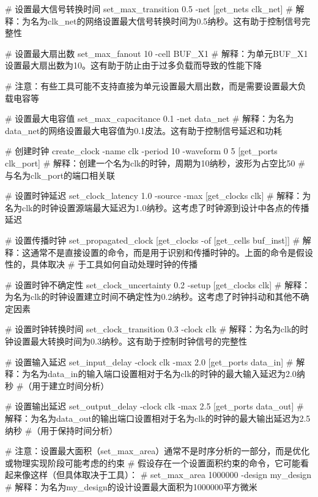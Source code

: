 \begin{CodeBlock}[language=BookTcl]
# 设置最大信号转换时间  
set_max_transition 0.5 -net [get_nets clk_net]  
# 解释：为名为clk_net的网络设置最大信号转换时间为0.5纳秒。这有助于控制信号完整性
  
# 设置最大扇出数  
set_max_fanout 10 -cell BUF_X1  
# 解释：为单元BUF_X1设置最大扇出数为10。这有助于防止由于过多负载而导致的性能下降
  
# 注意：有些工具可能不支持直接为单元设置最大扇出数，而是需要设置最大负载电容等
  
# 设置最大电容值  
set_max_capacitance 0.1 -net data_net  
# 解释：为名为data_net的网络设置最大电容值为0.1皮法。这有助于控制信号延迟和功耗
  
# 创建时钟  
create_clock -name clk -period 10 -waveform {0 5} [get_ports clk_port]  
# 解释：创建一个名为clk的时钟，周期为10纳秒，波形为占空比50%
# 与名为clk_port的端口相关联  
  
# 设置时钟延迟  
set_clock_latency 1.0 -source -max [get_clocks clk]  
# 解释：为名为clk的时钟设置源端最大延迟为1.0纳秒。这考虑了时钟源到设计中各点的传播延迟
  
# 设置传播时钟  
set_propagated_clock [get_clocks -of [get_cells buf_inst]]  
# 解释：这通常不是直接设置的命令，而是用于识别和传播时钟的。上面的命令是假设性的，具体取决
# 于工具如何自动处理时钟的传播  
  
# 设置时钟不确定性  
set_clock_uncertainty 0.2 -setup [get_clocks clk]  
# 解释：为名为clk的时钟设置建立时间不确定性为0.2纳秒。这考虑了时钟抖动和其他不确定因素
  
# 设置时钟转换时间  
set_clock_transition 0.3 -clock clk  
# 解释：为名为clk的时钟设置最大转换时间为0.3纳秒。这有助于控制时钟信号的完整性
  
# 设置输入延迟  
set_input_delay -clock clk -max 2.0 [get_ports data_in]  
# 解释：为名为data_in的输入端口设置相对于名为clk的时钟的最大输入延迟为2.0纳秒
#（用于建立时间分析）  
  
# 设置输出延迟  
set_output_delay -clock clk -max 2.5 [get_ports data_out]  
# 解释：为名为data_out的输出端口设置相对于名为clk的时钟的最大输出延迟为2.5纳秒
#（用于保持时间分析）  
  
# 注意：设置最大面积（set_max_area）通常不是时序分析的一部分，而是优化或物理实现阶段可能考虑的约束  
# 假设存在一个设置面积约束的命令，它可能看起来像这样（但具体取决于工具）：  
# set_max_area 1000000 -design my_design  
# 解释：为名为my_design的设计设置最大面积为1000000平方微米
\end{CodeBlock}

